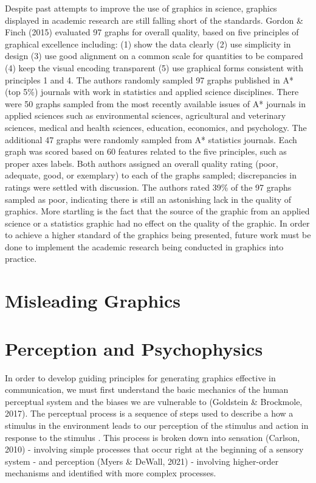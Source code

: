 \documentclass[print]{nuthesis}
\begin{document}
Despite past attempts to improve the use of graphics in science, graphics displayed in academic research are still falling short of the standards. Gordon \& Finch (2015) evaluated 97 graphs for overall quality, based on five principles of graphical excellence including: (1) show the data clearly (2) use simplicity in design (3) use good alignment on a common scale for quantities to be compared (4) keep the visual encoding transparent (5) use graphical forms consistent with principles 1 and 4.
The authors randomly sampled 97 graphs published in A* (top 5\%) journals with work in statistics and applied science disciplines.
There were 50 graphs sampled from the most recently available issues of A* journals in applied sciences such as environmental sciences, agricultural and veterinary sciences, medical and health sciences, education, economics, and psychology.
The additional 47 graphs were randomly sampled from A* statistics journals.
Each graph was scored based on 60 features related to the five principles, such as proper axes labels.
Both authors assigned an overall quality rating (poor, adequate, good, or exemplary) to each of the graphs sampled; discrepancies in ratings were settled with discussion.
The authors rated 39\% of the 97 graphs sampled as poor, indicating there is still an astonishing lack in the quality of graphics.
More startling is the fact that the source of the graphic from an applied science or a statistics graphic had no effect on the quality of the graphic.
In order to achieve a higher standard of the graphics being presented, future work must be done to implement the academic research being conducted in graphics into practice.

\hypertarget{misleading-graphics}{%
\section{Misleading Graphics}\label{misleading-graphics}}

\hypertarget{perception-and-psychophysics}{%
\section{Perception and Psychophysics}\label{perception-and-psychophysics}}

In order to develop guiding principles for generating graphics effective in communication, we must first understand the basic mechanics of the human perceptual system and the biases we are vulnerable to (Goldstein \& Brockmole, 2017).
The perceptual process is a sequence of steps used to describe a how a stimulus in the environment leads to our perception of the stimulus and action in response to the stimulus .
This process is broken down into sensation (Carlson, 2010) - involving simple processes that occur right at the beginning of a sensory system - and perception (Myers \& DeWall, 2021) - involving higher-order mechanisms and identified with more complex processes.
\end{document}
